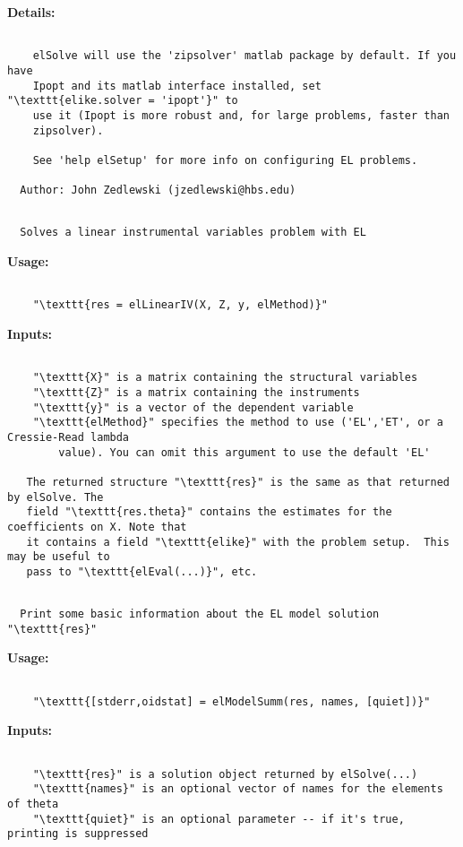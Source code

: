 {\small\textbf{Details:}}
\begin{lstlisting}
 
    elSolve will use the 'zipsolver' matlab package by default. If you have
    Ipopt and its matlab interface installed, set "\texttt{elike.solver = 'ipopt'}" to
    use it (Ipopt is more robust and, for large problems, faster than
    zipsolver).
 
    See 'help elSetup' for more info on configuring EL problems.
    
  Author: John Zedlewski (jzedlewski@hbs.edu)  
  

\end{lstlisting}
\begin{lstlisting}
  Solves a linear instrumental variables problem with EL
 \end{lstlisting}
{\small\textbf{Usage:}}
\begin{lstlisting}
 
    "\texttt{res = elLinearIV(X, Z, y, elMethod)}"
 \end{lstlisting}
{\small\textbf{Inputs:}}
\begin{lstlisting}
 
    "\texttt{X}" is a matrix containing the structural variables
    "\texttt{Z}" is a matrix containing the instruments
    "\texttt{y}" is a vector of the dependent variable
    "\texttt{elMethod}" specifies the method to use ('EL','ET', or a Cressie-Read lambda
        value). You can omit this argument to use the default 'EL'
 
   The returned structure "\texttt{res}" is the same as that returned by elSolve. The
   field "\texttt{res.theta}" contains the estimates for the coefficients on X. Note that
   it contains a field "\texttt{elike}" with the problem setup.  This may be useful to
   pass to "\texttt{elEval(...)}", etc.
 

\end{lstlisting}
\begin{lstlisting}
  Print some basic information about the EL model solution "\texttt{res}"
 \end{lstlisting}
{\small\textbf{Usage:}}
\begin{lstlisting}
 
    "\texttt{[stderr,oidstat] = elModelSumm(res, names, [quiet])}"
 \end{lstlisting}
{\small\textbf{Inputs:}}
\begin{lstlisting}
 
    "\texttt{res}" is a solution object returned by elSolve(...)
    "\texttt{names}" is an optional vector of names for the elements of theta
    "\texttt{quiet}" is an optional parameter -- if it's true, printing is suppressed
 \end{lstlisting}
